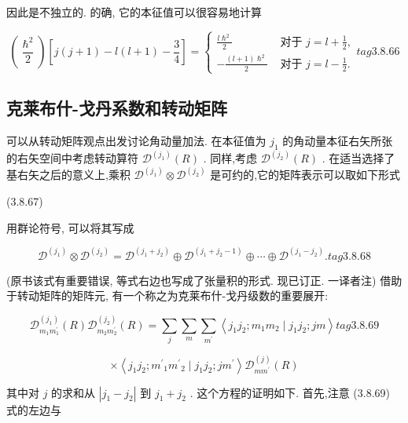 因此是不独立的. 的确, 它的本征值可以很容易地计算

$$
\left( \frac{{\hslash }^{2}}{2}\right) \left\lbrack {j\left( {j + 1}\right) - l\left( {l + 1}\right) - \frac{3}{4}}\right\rbrack = \left\{ \begin{array}{ll} \frac{l{\hslash }^{2}}{2} & \text{ 对于 }j = l + \frac{1}{2}, \\ - \frac{\left( {l + 1}\right) {\hslash }^{2}}{2} & \text{ 对于 }j = l - \frac{1}{2}. \end{array}\right. tag{3.8.66}
$$

\subsection{克莱布什-戈丹系数和转动矩阵}

可以从转动矩阵观点出发讨论角动量加法. 在本征值为 ${j}_{1}$ 的角动量本征右矢所张的右矢空间中考虑转动算符 ${\mathcal{D}}^{\left( {j}_{1}\right) }\left( R\right)$ . 同样,考虑 ${\mathcal{D}}^{\left( {j}_{2}\right) }\left( R\right)$ . 在适当选择了基右矢之后的意义上,乘积 ${\mathcal{D}}^{\left( {j}_{1}\right) } \otimes {\mathcal{D}}^{\left( {j}_{2}\right) }$ 是可约的,它的矩阵表示可以取如下形式

(3.8.67)

用群论符号, 可以将其写成

$$
{\mathcal{D}}^{\left( {j}_{1}\right) } \otimes {\mathcal{D}}^{\left( {j}_{2}\right) } = {\mathcal{D}}^{\left( {j}_{1} + {j}_{2}\right) } \oplus {\mathcal{D}}^{\left( {j}_{1} + {j}_{2} - 1\right) } \oplus \cdots \oplus {\mathcal{D}}^{\left( {j}_{1} - {j}_{2}\right) }. tag{3. 8.68}
$$

(原书该式有重要错误, 等式右边也写成了张量积的形式. 现已订正. 一译者注) 借助于转动矩阵的矩阵元, 有一个称之为克莱布什-戈丹级数的重要展开:

$$
{\mathcal{D}}_{{m}_{1}{m}_{1}^{\prime }}^{\left( {j}_{1}\right) }\left( R\right) {\mathcal{D}}_{{m}_{2}{m}_{2}^{\prime }}^{\left( {j}_{2}\right) }\left( R\right) = \mathop{\sum }\limits_{j}\mathop{\sum }\limits_{m}\mathop{\sum }\limits_{{m}^{\prime }}\left\langle {{j}_{1}{j}_{2};{m}_{1}{m}_{2} \mid {j}_{1}{j}_{2};{jm}}\right\rangle tag{3.8.69}
$$

$$
\times \left\langle {{j}_{1}{j}_{2};{m}^{\prime }{}_{1}{m}^{\prime }{}_{2} \mid {j}_{1}{j}_{2};j{m}^{\prime }}\right\rangle {\mathcal{D}}_{m{m}^{\prime }}^{\left( j\right) }\left( R\right)
$$

其中对 $j$ 的求和从 $\left| {{j}_{1} - {j}_{2}}\right|$ 到 ${j}_{1} + {j}_{2}$ . 这个方程的证明如下. 首先,注意 (3.8.69) 式的左边与

